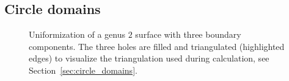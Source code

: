 \documentclass[Thesis]{subfiles}
\begin{document}
\subsection{Circle domains}

\begin{figure}
\centering
{}
\caption{
Uniformization of a genus $2$ surface with three boundary components. 
The three holes are filled and triangulated (highlighted edges) to visualize the triangulation used during calculation, see Section~\ref{sec:circle_domains}.
}
\label{fig:hyperelliptic_circle_domain}
\end{figure}


\subfilebibliography

%
%
%
%
\end{document}
